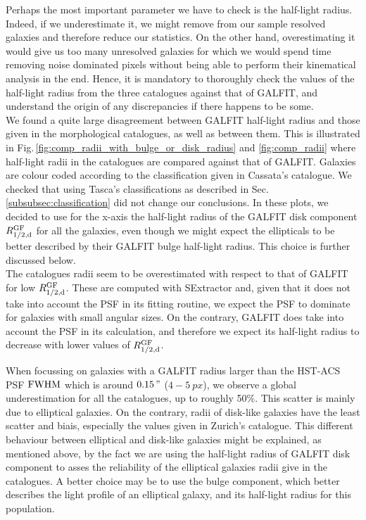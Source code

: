 Perhaps the most important parameter we have to check is the half-light radius. Indeed, if we underestimate it, we might remove from our sample resolved galaxies and therefore reduce our statistics. On the other hand, overestimating it would give us too many unresolved galaxies for which we would spend time removing noise dominated pixels without being able to perform their kinematical analysis in the end. Hence, it is mandatory to thoroughly check the values of the half-light radius from the three catalogues against that of GALFIT, and understand the origin of any discrepancies if there happens to be some. \\

We found a quite large disagreement between GALFIT half-light radius and those given in the morphological catalogues, as well as between them. This is illustrated in Fig.\,\ref{fig:comp_radii_with_bulge_or_disk_radius} and \ref{fig:comp_radii} where half-light radii in the catalogues are compared against that of GALFIT. Galaxies are colour coded according to the classification given in Cassata's catalogue. We checked that using Tasca's classifications as described in Sec.\,\ref{subsubsec:classification} did not change our conclusions. In these plots, we decided to use for the x-axis the half-light radius of the GALFIT disk component $R_{1/2 , \rm{d}}^{\rm{GF}}$ for all the galaxies, even though we might expect the ellipticals to be better described by their GALFIT bulge half-light radius. This choice is further discussed below.\\

The catalogues radii seem to be overestimated with respect to that of GALFIT for low $R_{1/2 , \rm{d}}^{\rm{GF}}$. These are computed with SExtractor and, given that it does not take into account the PSF in its fitting routine, we expect the PSF to dominate for galaxies with small angular sizes. On the contrary, GALFIT does take into account the PSF in its calculation, and therefore we expect its half-light radius to decrease with lower values of $R_{1/2 , \rm{d}}^{\rm{GF}}$. 

When focussing on galaxies with a GALFIT radius larger than the HST-ACS PSF $\rm{FWHM}$ which is around $\SI{0.15}{"}$ ($4 - \SI{5}{px}$), we observe a global underestimation for all the catalogues, up to roughly 50\%. This scatter is mainly due to elliptical galaxies. On the contrary, radii of disk-like galaxies have the least scatter and biais, especially the values given in Zurich's catalogue. This different behaviour between elliptical and disk-like galaxies might be explained, as mentioned above, by the fact we are using the half-light radius of GALFIT disk component to asses the reliability of the elliptical galaxies radii give in the catalogues. A better choice may be to use the bulge component, which better describes the light profile of an elliptical galaxy, and its half-light radius for this population.\\

